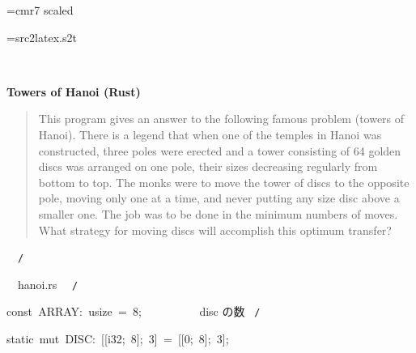 \documentclass{article}
\begin{document}
\ifx\sevenrm\undefined
  \font\sevenrm=cmr7 scaled 
\fi

\newread\MyStyle
\openin\MyStyle=src2latex.s2t
\ifeof\MyStyle
  \closein\MyStyle
\else
  
  \closein\MyStyle
\fi

\def\mc{\relax}
\def\gt{\relax}
\def\sc{\scshape}

\tt\mc 

\noindent
\rm\mc {\tt /}{\tt *}\  \hrulefill \rm\mc \ {\tt *}

\noindent
\mbox{}\hfill

\noindent
\mbox{}\hfill

\noindent
\mbox{} {}%

\centerline{\bf Towers of Hanoi (Rust)}

\begin{quote}

This program gives an answer to the following famous problem (towers of
Hanoi).
There is a legend that when one of the temples in Hanoi was constructed,
three poles were erected and a tower consisting of 64 golden discs was
arranged on one pole, their sizes decreasing regularly from bottom to top.
The monks were to move the tower of discs to the opposite pole, moving
only one at a time, and never putting any size disc above a smaller one.
The job was to be done in the minimum numbers of moves. What strategy for
moving discs will accomplish this optimum transfer?
\end{quote}


\noindent
\mbox{}\hfill

\noindent
\mbox{}{\tt *}\  \hrulefill \rm\mc \ {\tt *}{\tt /}
\tt\mc 

\noindent
\mbox{}\hfill

\noindent
\mbox{}\hfill

\noindent
\mbox{}\rm\mc {\tt /}{\tt *}\  \hrulefill\ hanoi.rs \ \hrulefill \rm\mc \ {\tt *}{\tt /}
\tt\mc 

\noindent
\mbox{}\hfill

\noindent
\mbox{}\hfill

\noindent
\mbox{}const{\tt\mc \ }ARRAY:{\tt\mc \ }usize{\tt\mc \ }={\tt\mc \ }8;{\tt\mc \ }{\tt\mc \ \ \ \ \ \ \ \ }\rm\mc {\tt /}{\tt *}\  {}disc の数 \hfill \rm\mc \ {\tt *}{\tt /}
\tt\mc 

\noindent
\mbox{}\hfill

\noindent
\mbox{}static{\tt\mc \ }mut{\tt\mc \ }DISC:{\tt\mc \ }[[i32;{\tt\mc \ }8];{\tt\mc \ }3]{\tt\mc \ }={\tt\mc \ }[[0;{\tt\mc \ }8];{\tt\mc \ }3];
\end{document}
